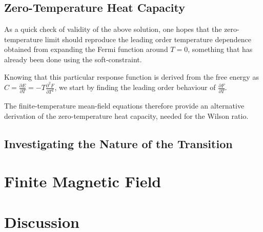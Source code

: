 \documentclass[12pt]{article}
\begin{document}
\subsection{Zero-Temperature Heat Capacity}

As a quick check of validity of the above solution, one hopes that the zero-temperature limit should reproduce the leading order temperature dependence obtained from expanding the Fermi function around $ T = 0 $, something that has already been done using the soft-constraint.

Knowing that this particular response function is derived from the free energy as $ C = \frac{\partial E}{\partial T} = - T \frac{\partial^{2} F}{\partial T ^2} $, we start by finding the leading order behaviour of $ \frac{\partial F}{\partial T} $.


The finite-temperature mean-field equations therefore provide an alternative derivation of the zero-temperature heat capacity, needed for the Wilson ratio.


\subsection{Investigating the Nature of the Transition}


\section{Finite Magnetic Field}


\section{Discussion}
\end{document}
